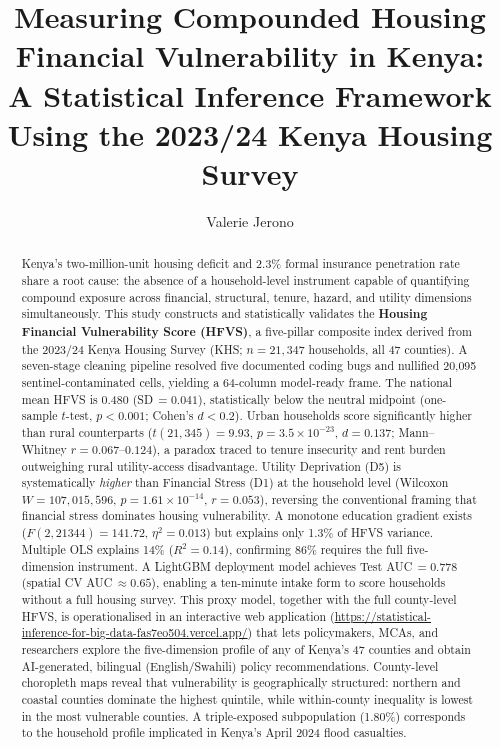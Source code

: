\documentclass[3p,twocolumn,10pt]{elsarticle}
\begin{document}
\begin{frontmatter}

\title{Measuring Compounded Housing Financial Vulnerability in Kenya:\\
A Statistical Inference Framework Using the 2023/24 Kenya Housing Survey}

\author[inst1]{Valerie Jerono}


\begin{abstract}
Kenya's two-million-unit housing deficit and 2.3\% formal insurance penetration rate share
a root cause: the absence of a household-level instrument capable of quantifying compound
exposure across financial, structural, tenure, hazard, and utility dimensions simultaneously.
This study constructs and statistically validates the \textbf{Housing Financial Vulnerability
Score (HFVS)}, a five-pillar composite index derived from the 2023/24 Kenya Housing Survey
(KHS; $n=21{,}347$ households, all 47 counties). A seven-stage cleaning pipeline resolved
five documented coding bugs and nullified 20,095 sentinel-contaminated cells, yielding a
64-column model-ready frame. The national mean HFVS is 0.480 (SD\,$=0.041$), statistically
below the neutral midpoint (one-sample $t$-test, $p<0.001$; Cohen's $d<0.2$). Urban
households score significantly higher than rural counterparts ($t(21{,}345)=9.93$,
$p=3.5\times10^{-23}$, $d=0.137$; Mann--Whitney $r=0.067$--$0.124$), a paradox traced to
tenure insecurity and rent burden outweighing rural utility-access disadvantage. Utility
Deprivation (D5) is systematically \emph{higher} than Financial Stress (D1) at the
household level (Wilcoxon $W=107{,}015{,}596$, $p=1.61\times10^{-14}$, $r=0.053$),
reversing the conventional framing that financial stress dominates housing vulnerability.
A monotone education gradient exists ($F(2,21344)=141.72$, $\eta^2=0.013$) but explains
only 1.3\% of HFVS variance. Multiple OLS explains 14\% ($R^2=0.14$), confirming 86\%
requires the full five-dimension instrument. A LightGBM deployment model achieves Test
AUC\,$=0.778$ (spatial CV AUC\,$\approx0.65$), enabling a ten-minute intake form to
score households without a full housing survey. This proxy model, together with the full
county-level HFVS, is operationalised in an interactive web application
(\url{https://statistical-inference-for-big-data-fas7eo504.vercel.app/}) that lets
policymakers, MCAs, and researchers explore the five-dimension profile of any of Kenya's
47 counties and obtain AI-generated, bilingual (English/Swahili) policy recommendations.
County-level choropleth maps reveal that vulnerability is geographically structured:
northern and coastal counties dominate the highest quintile, while within-county
inequality is lowest in the most vulnerable counties. A triple-exposed subpopulation
(1.80\%) corresponds to the household profile implicated in Kenya's April 2024 flood
casualties.
\end{abstract}


\end{frontmatter}
\end{document}
